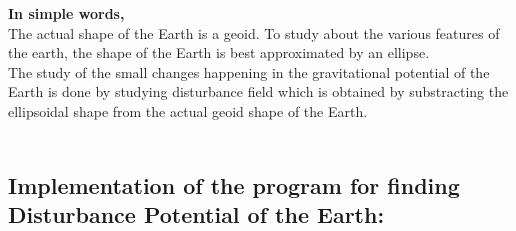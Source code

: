 \documentclass[a4paper,12pt]{article}
\begin{document}
\textbf{In simple words,}
\\The actual shape of the Earth is a geoid. To study about the various features of the earth, the shape of the Earth is best approximated by an ellipse.
\\The study of the small changes happening in the gravitational potential of the Earth is done by studying disturbance field which is obtained by substracting the ellipsoidal shape from the actual geoid shape of the Earth.\\\\

\subsection{Implementation of the program for finding\\Disturbance Potential of the Earth:}
\end{document}
